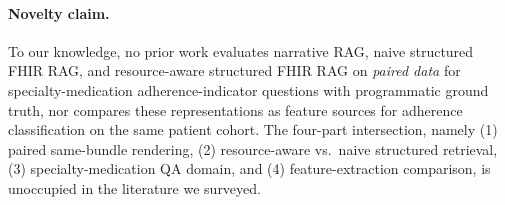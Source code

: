 \paragraph{Novelty claim.}
To our knowledge, no prior work evaluates narrative RAG, naive structured FHIR RAG, and
resource-aware structured FHIR RAG on \emph{paired data} for specialty-medication
adherence-indicator questions with programmatic ground truth, nor compares these
representations as feature sources for adherence classification on the same patient cohort.
The four-part intersection, namely (1) paired same-bundle rendering, (2) resource-aware vs.\
naive structured retrieval, (3) specialty-medication QA domain, and (4) feature-extraction
comparison, is unoccupied in the literature we surveyed.
